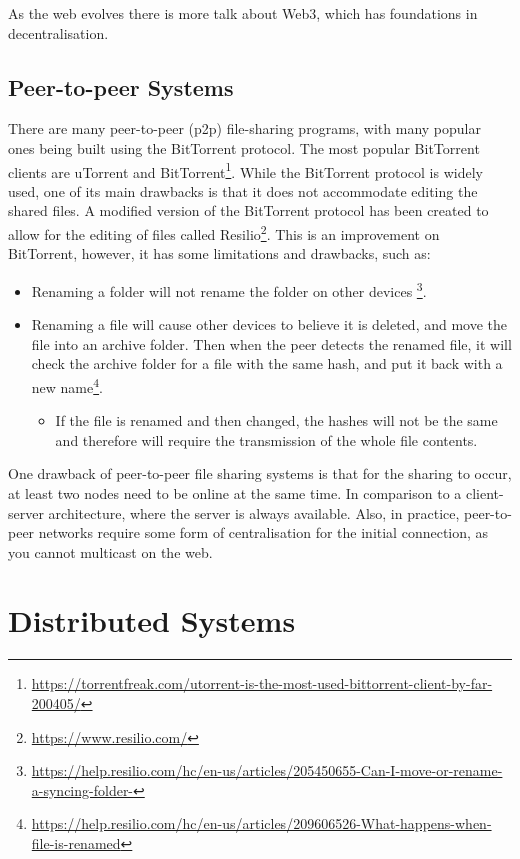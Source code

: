 \documentclass[12pt]{report}
\begin{document}
As the web evolves there is more talk about Web3\cite{WhatIsWeb3}, which has foundations in decentralisation.
\subsection{Peer-to-peer Systems}
There are many peer-to-peer (p2p) file-sharing programs, with many popular ones being built using the BitTorrent protocol. The most popular BitTorrent clients are uTorrent and BitTorrent\footnote{\url{https://torrentfreak.com/utorrent-is-the-most-used-bittorrent-client-by-far-200405/}}. While the BitTorrent protocol is widely used, one of its main drawbacks is that it does not accommodate editing the shared files. A modified version of the  BitTorrent protocol has been created to allow for the editing of files called Resilio\footnote{\url{https://www.resilio.com/}}. This is an improvement on BitTorrent, however, it has some limitations and drawbacks, such as:
\begin{itemize}
    \item Renaming a folder will not rename the folder on other devices \footnote{\url{https://help.resilio.com/hc/en-us/articles/205450655-Can-I-move-or-rename-a-syncing-folder-}}.
    \item Renaming a file will cause other devices to believe it is deleted, and move the file into an archive folder. Then when the peer detects the renamed file, it will check the archive folder for a file with the same hash, and put it back with a new name\footnote{\url{https://help.resilio.com/hc/en-us/articles/209606526-What-happens-when-file-is-renamed}}.
          \begin{itemize}
              \item If the file is renamed and then changed, the hashes will not be the same and therefore will require the transmission of the whole file contents.
          \end{itemize}
\end{itemize}  \par
One drawback of peer-to-peer file sharing systems is that for the sharing to occur, at least two nodes need to be online at the same time. In comparison to a client-server architecture, where the server is always available. Also, in practice, peer-to-peer networks require some form of centralisation for the initial connection, as you cannot multicast on the web.

\section{Distributed Systems}
\end{document}
